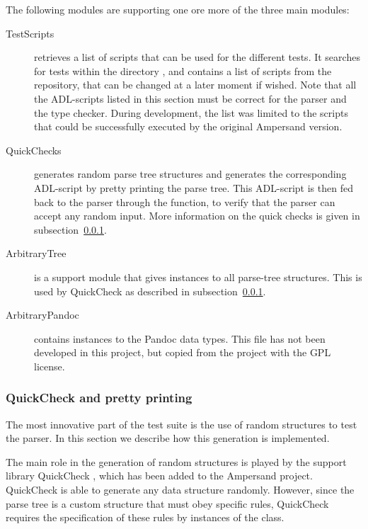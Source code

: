   The following modules are supporting one ore more of the three main modules:
  \begin{description}	  
    \item[TestScripts] retrieves a list of scripts that can be used for the different tests.
      It searches for tests within the directory , and contains a list of scripts from the  repository, that can be changed at a later moment if wished.
      Note that all the ADL-scripts listed in this section must be correct for the parser and the type checker.
      During development, the list was limited to the scripts that could be successfully executed by the original Ampersand version.   
	  
    \item[QuickChecks] generates random parse tree structures and generates the corresponding ADL-script by pretty printing the parse tree.
      This ADL-script is then fed back to the parser through the  function, to verify that the parser can accept any random input.
      More information on the quick checks is given in subsection~\ref{tests:quick-check}.
    
    \item[ArbitraryTree] is a support module that gives  instances to all parse-tree structures.
      This is used by QuickCheck as described in subsection~\ref{tests:quick-check}.
    
    \item[ArbitraryPandoc] contains  instances to the Pandoc data types.
      This file has not been developed in this project, but copied from the  project with the GPL license.
  \end{description}

  \subsubsection{QuickCheck and pretty printing}
  \label{tests:quick-check}
  The most innovative part of the test suite is the use of random structures to test the parser.
  In this section we describe how this generation is implemented.
  
  The main role in the generation of random structures is played by the support library QuickCheck , which has been added to the Ampersand project.
  QuickCheck is able to generate any data structure randomly.
  However, since the parse tree is a custom structure that must obey specific rules, QuickCheck requires the specification of these rules by instances of the  class.
  
